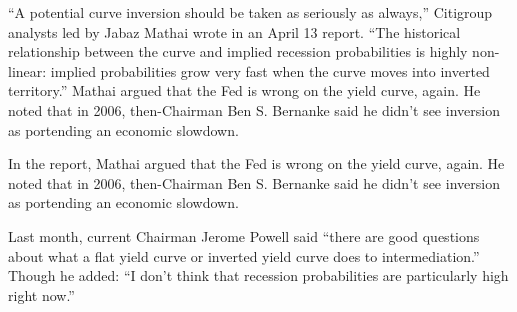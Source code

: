“A potential curve inversion should be taken as seriously as always,” Citigroup analysts led by Jabaz Mathai wrote in an April 13 report. “The historical relationship between the curve and implied recession probabilities is highly non-linear: implied probabilities grow very fast when the curve moves into inverted territory.” Mathai argued that the Fed is wrong on the yield curve, again. He noted that in 2006, then-Chairman Ben S. Bernanke said he didn’t see inversion as portending an economic slowdown.

In the report, Mathai argued that the Fed is wrong on the yield curve, again. He noted that in 2006, then-Chairman Ben S. Bernanke said he didn't see inversion as portending an economic slowdown.

Last month, current Chairman Jerome Powell said “there are good questions about what a flat yield curve or inverted yield curve does to intermediation.” Though he added: “I don’t think that recession probabilities are particularly high right now.”